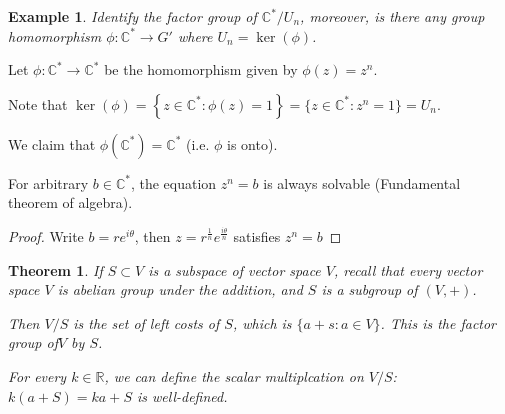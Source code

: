 \documentclass{article}
\theoremstyle{MyNonumberplain}
\theoremstyle{break}
\newtheorem*{proof}{Proof. }
\newcommand{\p}{\phi}
\theoremstyle{break}
\newtheorem{theorem}{Theorem}[section]
\newtheorem{example}{Example}[section]
\theoremstyle{break}
\theoremstyle{definition}
\theoremstyle{break}
\begin{document}
\begin{expbox}
    \begin{example}
        Identify the factor group of $\mathbb{C}^{\ast} / U_n$, moreover, is there any
        group homomorphism $\p : \mathbb{C}^{\ast} \rightarrow G'$ where $U_n = \ker
        \left( \p \right)$.
    \end{example}
    \begin{ansbox}
        Let $\p : \mathbb{C}^{\ast} \rightarrow \mathbb{C}^{\ast}$ be the homomorphism
        given by $\p (z) = z^n$.\bigskip

        Note that $\ker \left( \p \right) = \left\{ z \in \mathbb{C}^{\ast} : \p (z)
        = 1 \right\} = \{ z \in \mathbb{C}^{\ast} : z^n = 1 \} = U_n$.\bigskip

        We claim that $\p (\mathbb{C}^{\ast}) =\mathbb{C}^{\ast}$ (i.e. $\p$ is onto).\bigskip

        For arbitrary $b \in \mathbb{C}^{\ast}$, the equation $z^n = b$ is always
        solvable (Fundamental theorem of algebra).
        \begin{prfbox}
            \begin{proof}
                Write $b = r e^{i \theta}$, then $z = r^{\frac{1}{n}} e^{\frac{i
                \theta}{n}}$ satisfies $z^n = b$
            \end{proof}
        \end{prfbox}
    \end{ansbox}
\end{expbox}

\begin{thmbox}
    \begin{theorem}
        If $S \subset V$ is a subspace of vector space $V$, recall that every vector
        space $V$ is abelian group under the addition, and $S$ is a subgroup of $(V,
        +)$.\bigskip

        Then $V / S$ is the set of left costs of $S$, which is $\{ a + s : a \in V
        \}$. This is the factor group of\enspace$V$ by $S$.\bigskip

        For every $k \in \mathbb{R}$, we can define the scalar multiplcation on $V /
        S$: $k (a + S) = k a + S$ is well-defined.
    \end{theorem}

\end{thmbox}
\end{document}
